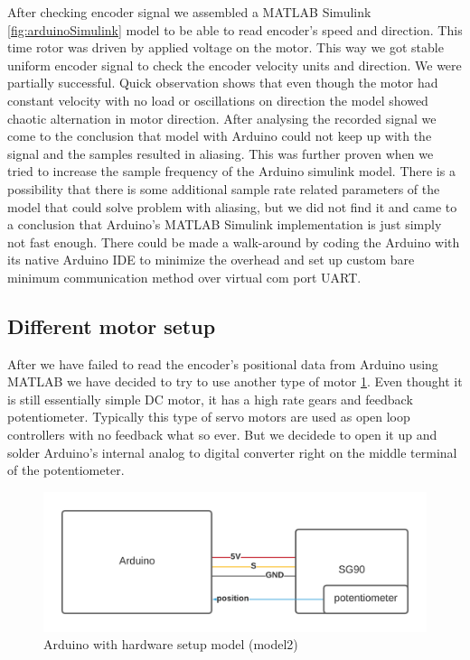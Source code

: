 \documentclass[]{final_report}
\begin{document}
After checking encoder signal we assembled a MATLAB Simulink \ref{fig:arduinoSimulink} model to be able to read encoder's speed and direction. This time rotor was driven by applied voltage on the motor. This way we got stable uniform encoder signal to check the encoder velocity units and direction. We were partially successful. Quick observation shows that even though the motor had constant velocity with no load or oscillations on direction the model showed chaotic alternation in motor direction. After analysing the recorded signal we come to the conclusion that model with Arduino could not keep up with the signal and the samples resulted in aliasing. This was further proven when we tried to increase the sample frequency of the Arduino simulink model. There is a possibility that there is some additional sample rate related parameters of the model that could solve problem with aliasing, but we did not find it and came to a conclusion that Arduino's MATLAB Simulink implementation is just simply not fast enough. There could be made a walk-around by coding the Arduino with its native Arduino IDE to minimize the overhead and set up custom bare minimum communication method over virtual com port UART.

\subsection{Different motor setup}

After we have failed to read the encoder's positional data from Arduino using MATLAB we have decided to try to use another type of motor \ref{fig:arduinoMotorSetupDiag2}. Even thought it is still essentially simple DC motor, it has a high rate gears and feedback potentiometer. Typically this type of servo motors are used as open loop controllers with no feedback what so ever. But we decidede to open it up and solder Arduino's internal analog to digital converter right on the middle terminal of the potentiometer.

\begin{figure} [h!]
\centerline{\includegraphics[width=.75\textwidth]{Screenshots for paper/arduino/model 2/model2.png}}
\caption{Arduino with hardware setup model (model2)}
\label{fig:arduinoMotorSetupDiag2}
\end{figure}
\end{document}
